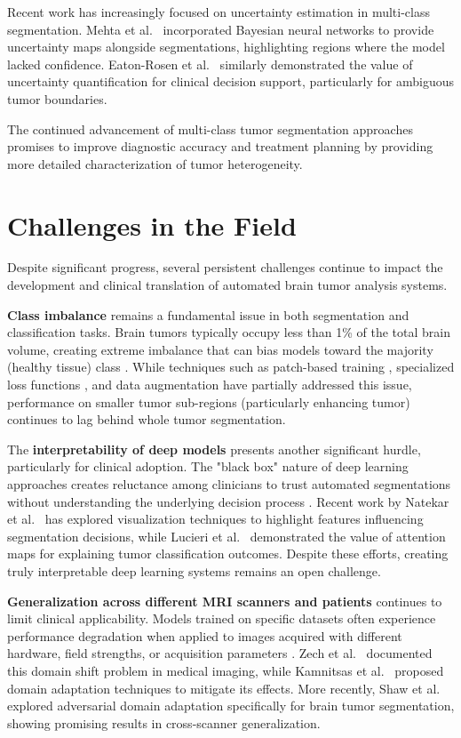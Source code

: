 Recent work has increasingly focused on uncertainty estimation in multi-class segmentation. Mehta et al.\ \cite{Mehta2020} incorporated Bayesian neural networks to provide uncertainty maps alongside segmentations, highlighting regions where the model lacked confidence. Eaton-Rosen et al.\ \cite{EatonRosen2018} similarly demonstrated the value of uncertainty quantification for clinical decision support, particularly for ambiguous tumor boundaries.

The continued advancement of multi-class tumor segmentation approaches promises to improve diagnostic accuracy and treatment planning by providing more detailed characterization of tumor heterogeneity.

\section{Challenges in the Field}

Despite significant progress, several persistent challenges continue to impact the development and clinical translation of automated brain tumor analysis systems.

\textbf{Class imbalance} remains a fundamental issue in both segmentation and classification tasks. Brain tumors typically occupy less than 1\% of the total brain volume, creating extreme imbalance that can bias models toward the majority (healthy tissue) class \cite{Pereira2016}. While techniques such as patch-based training \cite{Havaei2017}, specialized loss functions \cite{Isensee2018}, and data augmentation \cite{Wang2019} have partially addressed this issue, performance on smaller tumor sub-regions (particularly enhancing tumor) continues to lag behind whole tumor segmentation.

The \textbf{interpretability of deep models} presents another significant hurdle, particularly for clinical adoption. The "black box" nature of deep learning approaches creates reluctance among clinicians to trust automated segmentations without understanding the underlying decision process \cite{Holzinger2017}. Recent work by Natekar et al.\ \cite{Natekar2020} has explored visualization techniques to highlight features influencing segmentation decisions, while Lucieri et al.\ \cite{Lucieri2020} demonstrated the value of attention maps for explaining tumor classification outcomes. Despite these efforts, creating truly interpretable deep learning systems remains an open challenge.

\textbf{Generalization across different MRI scanners and patients} continues to limit clinical applicability. Models trained on specific datasets often experience performance degradation when applied to images acquired with different hardware, field strengths, or acquisition parameters \cite{Menze2015}. Zech et al.\ \cite{Zech2018} documented this domain shift problem in medical imaging, while Kamnitsas et al.\ \cite{Kamnitsas2017} proposed domain adaptation techniques to mitigate its effects. More recently, Shaw et al.\ \cite{Shaw2020} explored adversarial domain adaptation specifically for brain tumor segmentation, showing promising results in cross-scanner generalization.

